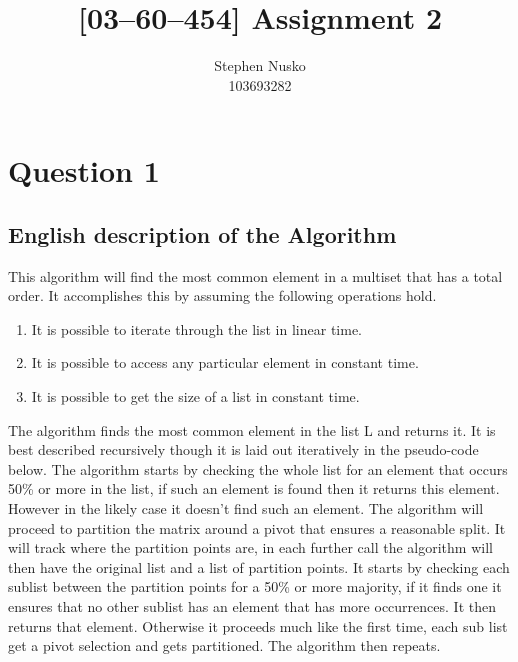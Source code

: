 \documentclass{article}
\title{[03--60--454] Assignment 2}
\author{Stephen Nusko \\ 103693282}
\begin{document}
	\thispagestyle{empty}
	\maketitle	
  \section{Question 1}
    \subsection{English description of the Algorithm}
      This algorithm will find the most common element in a multiset that has a total order. It accomplishes this by assuming the following operations hold.
      \begin{enumerate}
        \item It is possible to iterate through the list in linear time.
        \item It is possible to access any particular element in constant time.
        \item It is possible to get the size of a list in constant time.
      \end{enumerate}
      The algorithm finds the most common element in the list L and returns it. It is best described recursively though it is laid out iteratively in the pseudo-code below. The algorithm starts by checking the whole list for an element that occurs 50\% or more in the list, if such an element is found then it returns this element. However in the likely case it doesn't find such an element. The algorithm will proceed to partition the matrix around a pivot that ensures a reasonable split. It will track where the partition points are, in each further call the algorithm will then have the original list and a list of partition points. It starts by checking each sublist between the partition points for a 50\% or more majority, if it finds one it ensures that no other sublist has an element that has more occurrences. It then returns that element. Otherwise it proceeds much like the first time, each sub list get a pivot selection and gets partitioned. The algorithm then repeats.
\end{document}
